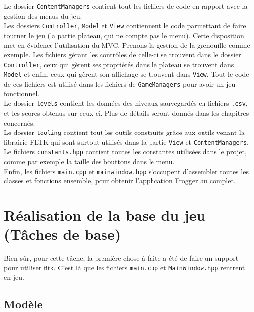 \documentclass[a4paper, 12pt]{article}
\begin{document}
Le dossier \texttt{ContentManagers} contient tout les fichiers de code en rapport avec la gestion des menus du jeu.\\

Les dossiers \texttt{Controller}, \texttt{Model} et \texttt{View} contiennent le code parmettant de faire tourner le jeu (la partie plateau, qui ne compte pas le menu).
Cette disposition met en évidence l'utilisation du MVC. Prenons la gestion de la grenouille comme exemple. 
Les fichiers gérant les contrôles de celle-ci se trouvent dans le dossier \texttt{Controller}, ceux qui gèrent ses propriétés dans le plateau se trouvent dans \texttt{Model} et enfin, ceux qui gèrent son affichage se trouvent dans \texttt{View}. Tout le code de ces fichiers est utilisé dans les fichiers de \texttt{GameManagers} pour avoir un jeu fonctionnel.\\

Le dossier \texttt{levels} contient les données des niveaux sauvegardés en fichiers \texttt{.csv}, et les scores obtenus sur ceux-ci. Plus de détails seront donnés dans les chapitres concernés. \\

Le dossier \texttt{tooling} contient tout les outils construits grâce aux outils venant la librairie FLTK qui sont surtout utilisés dans la partie \texttt{View} et \texttt{ContentManagers}. \\

Le fichiers \texttt{constants.hpp} contient toutes les constantes utilisées dans le projet, comme par exemple la taille des bouttons dans le menu. \\

Enfin, les fichiers \texttt{main.cpp} et \texttt{mainwindow.hpp} s'occupent d'assembler toutes les classes et fonctions ensemble, pour obtenir l'application Frogger au complet. 

\section{Réalisation de la base du jeu (Tâches de base)}
Bien sûr, pour cette tâche, la première chose à faite a été de faire un support pour utiliser fltk. C'est là que les fichiers \texttt{main.cpp} et \texttt{MainWindow.hpp} rentrent en jeu.

\subsection{Modèle}
\end{document}
